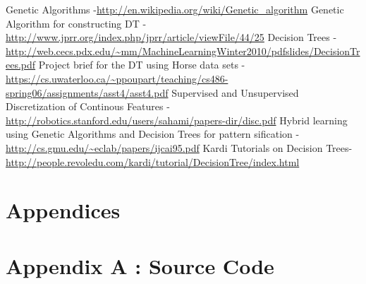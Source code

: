\documentclass[12pt]{report}
\begin{document}
\begin{thebibliography}{refs}
Genetic Algorithms  -\url{http://en.wikipedia.org/wiki/Genetic_algorithm}
Genetic Algorithm for constructing DT - \url{http://www.jprr.org/index.php/jprr/article/viewFile/44/25}
Decision Trees - \url{http://web.cecs.pdx.edu/~mm/MachineLearningWinter2010/pdfslides/DecisionTrees.pdf}
 Project brief for the DT  using Horse data sets  - \url{https://cs.uwaterloo.ca/~ppoupart/teaching/cs486-spring06/assignments/asst4/asst4.pdf}
Supervised and Unsupervised Discretization of Continous Features - \url{http://robotics.stanford.edu/users/sahami/papers-dir/disc.pdf}
Hybrid learning using Genetic Algorithms and Decision Trees for pattern sification - \url{http://cs.gmu.edu/~eclab/papers/ijcai95.pdf}
Kardi Tutorials on Decision Trees- \url{http://people.revoledu.com/kardi/tutorial/DecisionTree/index.html}

\end{thebibliography}

\newpage
\pagestyle{fancy}
\chead{}
\rfoot{\small{\thepage}}
\renewcommand{\headrulewidth}{0.4pt}
\renewcommand{\footrulewidth}{0.4pt}

\section*{Appendices}
\section*{Appendix A : Source Code}

%
%


\newpage
\pagestyle{fancy}
\chead{}
\rfoot{\small{\thepage}}
\renewcommand{\headrulewidth}{0.4pt}
\renewcommand{\footrulewidth}{0.4pt}
\end{document}
